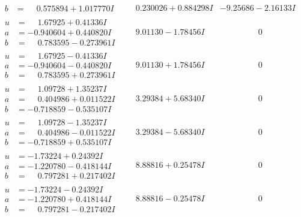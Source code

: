 \documentclass[1p]{elsarticle_modified}
\theoremstyle{definition}
\begin{document}
$$\begin{array}{c|c|c}
\begin{aligned}
b &= \phantom{-}0.575894 + 1.017770 I\end{aligned}
 & \phantom{-}0.230026 + 0.884298 I & -9.25686 - 2.16133 I \\ \hline\begin{aligned}
u &= \phantom{-}1.67925 + 0.41336 I \\
a &= -0.940604 + 0.440820 I \\
b &= \phantom{-}0.783595 - 0.273961 I\end{aligned}
 & \phantom{-}9.01130 - 1.78456 I & \phantom{-0.000000 } 0 \\ \hline\begin{aligned}
u &= \phantom{-}1.67925 - 0.41336 I \\
a &= -0.940604 - 0.440820 I \\
b &= \phantom{-}0.783595 + 0.273961 I\end{aligned}
 & \phantom{-}9.01130 + 1.78456 I & \phantom{-0.000000 } 0 \\ \hline\begin{aligned}
u &= \phantom{-}1.09728 + 1.35237 I \\
a &= \phantom{-}0.404986 + 0.011522 I \\
b &= -0.718859 - 0.535107 I\end{aligned}
 & \phantom{-}3.29384 + 5.68340 I & \phantom{-0.000000 } 0 \\ \hline\begin{aligned}
u &= \phantom{-}1.09728 - 1.35237 I \\
a &= \phantom{-}0.404986 - 0.011522 I \\
b &= -0.718859 + 0.535107 I\end{aligned}
 & \phantom{-}3.29384 - 5.68340 I & \phantom{-0.000000 } 0 \\ \hline\begin{aligned}
u &= -1.73224 + 0.24392 I \\
a &= -1.220780 - 0.418144 I \\
b &= \phantom{-}0.797281 + 0.217402 I\end{aligned}
 & \phantom{-}8.88816 + 0.25478 I & \phantom{-0.000000 } 0 \\ \hline\begin{aligned}
u &= -1.73224 - 0.24392 I \\
a &= -1.220780 + 0.418144 I \\
b &= \phantom{-}0.797281 - 0.217402 I\end{aligned}
 & \phantom{-}8.88816 - 0.25478 I & \phantom{-0.000000 } 0\\

\end{array}$$
\end{document}
